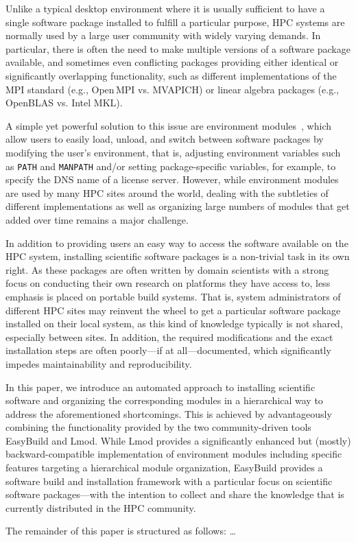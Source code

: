 Unlike a typical desktop environment where it is usually sufficient to have a
single software package installed to fulfill a particular purpose, HPC
systems are normally used by a large user community with widely varying
demands. In particular, there is often the need to make multiple versions of
a software package available, and sometimes even conflicting packages
providing either identical or significantly overlapping functionality, such
as different implementations of the MPI standard (e.g., Open\,MPI vs.
MVAPICH) or linear algebra packages (e.g., OpenBLAS vs. Intel MKL).

A simple yet powerful solution to this issue are environment
modules~\cite{environment_modules_paper}, which allow users to easily load,
unload, and switch between software packages by  modifying the user's
environment, that is, adjusting environment variables such as \texttt{PATH}
and \texttt{MANPATH} and/or setting package-specific variables, for example,
to specify the DNS name of a license server. However, while environment
modules are used by many HPC sites around the world, dealing with the
subtleties of different implementations as well as organizing large numbers
of modules that get added over time remains a major challenge.

In addition to providing users an easy way to access the software available
on the HPC system, installing scientific software packages is a non-trivial
task in its own right. As these packages are often written by domain
scientists with a strong focus on conducting their own research on platforms
they have access to, less emphasis is placed on portable build systems. That
is, system administrators of different HPC sites may reinvent the wheel to
get a particular software package installed on their local system, as this
kind of knowledge typically is not shared, especially between sites. In
addition, the required modifications and the exact installation steps are
often poorly---if at all---documented, which significantly impedes
maintainability and reproducibility.

In this paper, we introduce an automated approach to installing scientific
software and organizing the corresponding modules in a hierarchical way to
address the aforementioned shortcomings. This is achieved by advantageously
combining the functionality provided by the two community-driven tools
EasyBuild and Lmod. While Lmod provides a significantly enhanced but (mostly)
backward-compatible implementation of environment modules including specific
features targeting a hierarchical module organization, EasyBuild provides a
software build and installation framework with a particular focus on
scientific software packages---with the intention to collect and share the
knowledge that is currently distributed in the HPC community.

The remainder of this paper is structured as follows: \ldots

